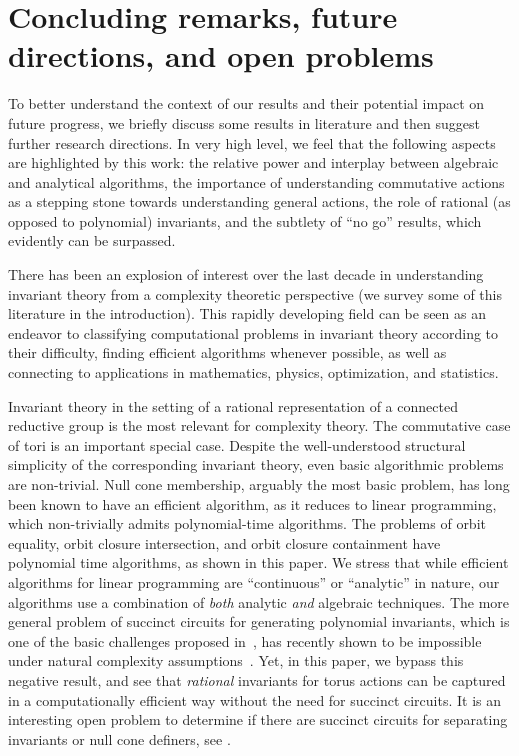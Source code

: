 %
\section{Concluding remarks, future directions, and open problems} \label{sec:future}
%
To better understand the context of our results and their potential impact on future progress, we briefly discuss some results in literature and then suggest further research directions.
In very high level, we feel that the following aspects are highlighted by this work:
the relative power and interplay between algebraic and analytical algorithms, the importance of understanding commutative actions as a stepping stone towards understanding general actions, the role of rational (as opposed to polynomial) invariants, and the subtlety of ``no go'' results, which evidently can be surpassed.

There has been an explosion of interest over the last decade in understanding invariant theory from a complexity theoretic perspective 
%
%
%
%
(we survey some of this literature in the introduction).
This rapidly developing field can be seen as an endeavor to classifying computational problems in invariant theory according to their difficulty,
finding efficient algorithms whenever possible, as well as connecting to applications in mathematics, physics, optimization, and statistics.

Invariant theory in the setting of a rational representation of a connected reductive group is the most relevant for complexity theory.
The commutative case of tori is an important special case.
Despite the well-understood structural simplicity of the corresponding invariant theory, even basic algorithmic problems are non-trivial.
Null cone membership, arguably the most basic problem, has long been known to have an efficient algorithm, as it reduces to linear programming, which non-trivially admits polynomial-time algorithms.
The problems of orbit equality, orbit closure intersection, and orbit closure containment have polynomial time algorithms, as shown in this paper.
We stress that while efficient algorithms for linear programming are ``continuous'' or ``analytic'' in nature, our algorithms use a combination of \emph{both} analytic \emph{and} algebraic techniques.
The more general problem of succinct circuits for generating polynomial invariants, which is one of the basic challenges proposed in~\cite{GCTV}, has recently shown to be impossible under natural complexity assumptions~\cite{GIMOWW}.
Yet, in this paper, we bypass this negative result, and see that \emph{rational} invariants for torus actions can be captured in a computationally efficient way without the need for succinct circuits.
It is an interesting open problem to determine if there are succinct circuits for separating invariants or null cone definers, see \cite[Problems~1.14, 1.15]{GIMOWW}.

